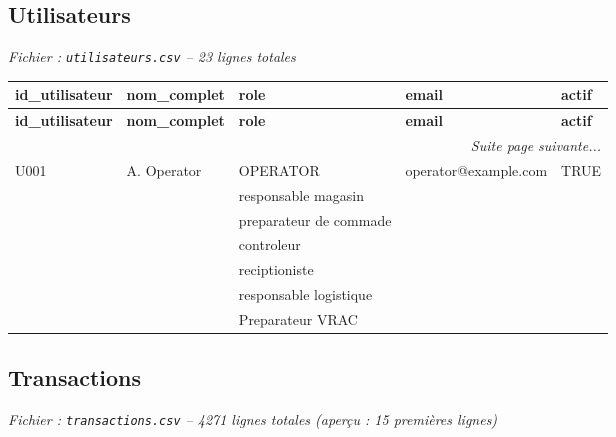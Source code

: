 \documentclass[a4paper,11pt]{article}
\begin{document}
\newpage

\subsection{Utilisateurs}

\textit{Fichier : \texttt{utilisateurs.csv} -- 23 lignes totales
}


\scriptsize
\begin{longtable}{|l|l|l|l|l|}
\hline
\rowcolor{headerblue}
\textbf{id\_utilisateur} & \textbf{nom\_complet} & \textbf{role} & \textbf{email} & \textbf{actif} \\ \hline
\endfirsthead
\hline
\rowcolor{headerblue}
\textbf{id\_utilisateur} & \textbf{nom\_complet} & \textbf{role} & \textbf{email} & \textbf{actif} \\ \hline
\endhead
\hline \multicolumn{5}{|r|}{\textit{Suite page suivante...}} \\ \hline
\endfoot
\hline
\endlastfoot
 U001 & A. Operator & OPERATOR & operator@example.com & TRUE \\ \hline
\rowcolor{rowgray}  &  & responsable magasin &  &  \\ \hline
  &  & preparateur de commade &  &  \\ \hline
\rowcolor{rowgray}  &  & controleur &  &  \\ \hline
  &  & reciptioniste &  &  \\ \hline
\rowcolor{rowgray}  &  & responsable logistique &  &  \\ \hline
  &  & Preparateur VRAC &  &  \\ \hline
\end{longtable}
\normalsize

\newpage

\subsection{Transactions}

\textit{Fichier : \texttt{transactions.csv} -- 4271 lignes totales
 (aperçu : 15 premières lignes)
}
\end{document}
